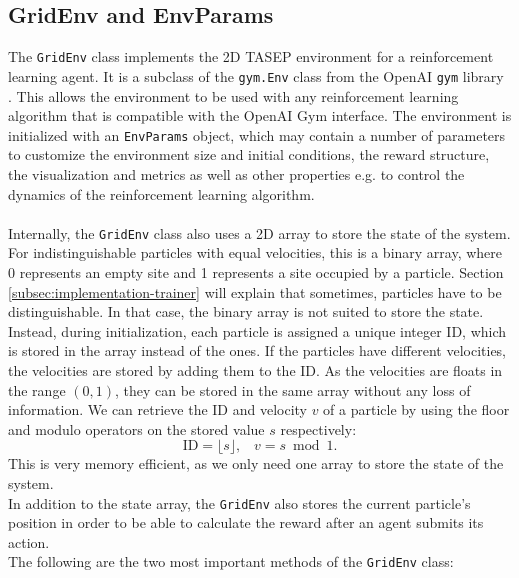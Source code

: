 \subsection{GridEnv and EnvParams}
\label{subsec:implementation-gridenv}
The \texttt{GridEnv} class implements the 2D TASEP environment for a reinforcement learning agent. It is a subclass of the \texttt{gym.Env} class from the OpenAI \texttt{gym} library \cite{brockman_openai_2016}. This allows the environment to be used with any reinforcement learning algorithm that is compatible with the OpenAI Gym interface. The environment is initialized with an \texttt{EnvParams} object, which may contain a number of parameters to customize the environment size and initial conditions, the reward structure, the visualization and metrics as well as other properties e.g. to control the dynamics of the reinforcement learning algorithm. 
\\
\\
Internally, the \texttt{GridEnv} class also uses a 2D array to store the state of the system. For indistinguishable particles with equal velocities, this is a binary array, where 0 represents an empty site and 1 represents a site occupied by a particle. Section \ref{subsec:implementation-trainer} will explain that sometimes, particles have to be distinguishable. In that case, the binary array is not suited to store the state. Instead, during initialization, each particle is assigned a unique integer ID, which is stored in the array instead of the ones. If the particles have different velocities, the velocities are stored by adding them to the ID. As the velocities are floats in the range $(0,1)$, they can be stored in the same array without any loss of information. We can retrieve the ID and velocity $v$ of a particle by using the floor and modulo operators on the stored value $s$ respectively:
\begin{equation}
    \text{ID} = \lfloor s \rfloor \text{,} \quad v = s \bmod 1 \text{.}
    \label{eq:state-to-id-velocity}
\end{equation}
This is very memory efficient, as we only need one array to store the state of the system. 
\\
In addition to the state array, the \texttt{GridEnv} also stores the current particle's position in order to be able to calculate the reward after an agent submits its action. 
\\
The following are the two most important methods of the \texttt{GridEnv} class:

